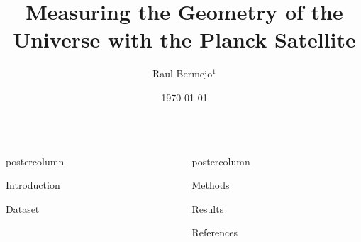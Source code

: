 \documentclass{beamer}
\title{\huge Measuring the Geometry of the Universe with the Planck Satellite}
\author{Raul Bermejo$^{1}$}
\institute[UniMelb]{$^{1}$School of Physics, University of Melbourne}
\date{\today}
\newlength{\columnheight}
\begin{document}
\begin{frame}
\begin{columns}
	\begin{column}{.54\textwidth}
		\begin{beamercolorbox}[center]{postercolumn}
			\begin{minipage}{.98\textwidth}  %
				\parbox[t][\columnheight]{\textwidth}{ %
					\begin{myblock}{Introduction}	
				
						
					\end{myblock}\vfill
					
					
					\begin{myblock}{Dataset}
					
					\end{myblock}\vfill
		}\end{minipage}\end{beamercolorbox}
	\end{column}
	
	
	\begin{column}{.46\textwidth}
		\begin{beamercolorbox}[center]{postercolumn}
			\begin{minipage}{.98\textwidth} %
				\parbox[t][\columnheight]{\textwidth}{ %
					\begin{myblock}{Methods}
					
					
					\end{myblock}\vfill
					
					
					\begin{myblock}{Results}
					
					\end{myblock}\vfill
					
					
					
					\begin{myblock}{References}
						\footnotesize
						
						
					\end{myblock}\vfill
		}\end{minipage}\end{beamercolorbox}
	\end{column}
\end{columns}
\end{frame}
\end{document}
